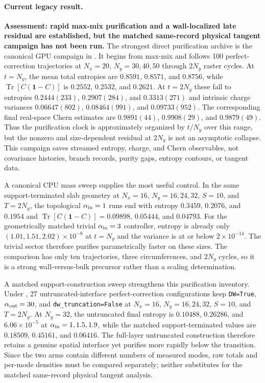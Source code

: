 \documentclass[aps,prx,twocolumn,floatfix,nofootinbib,superscriptaddress,longbibliography]{revtex4-2}
\newcommand{\qTr}{\operatorname{Tr}}
\newcommand{\code}[1]{\texttt{#1}}
\begin{document}
\paragraph*{Current legacy result.}
\textbf{Assessment: rapid max-mix purification and a wall-localized late residual are
established, but the matched same-record physical tangent campaign has not been run.}
The strongest direct purification archive is the canonical GPU campaign in
.  It begins from max-mix
and follows 100 perfect-correction trajectories at $N_x=20$, $N_y=30,40,50$ through
$2N_y$ raster cycles.  At $t=N_y$, the mean total entropies are $0.8591$, $0.8571$, and
$0.8756$, while $\qTr[C(\mathbf{1}-C)]$ is $0.2552$, $0.2532$, and $0.2621$.  At $t=2N_y$ these
fall to entropies $0.2444(233)$, $0.2907(284)$, and $0.3313(271)$ and intrinsic charge
variances $0.06647(802)$, $0.08464(991)$, and $0.09733(952)$.  The corresponding final
real-space Chern estimates are $0.9891(44)$, $0.9908(29)$, and $0.9879(49)$.  Thus the
purification clock is approximately organized by $t/N_y$ over this range, but the nonzero
and size-dependent residual at $2N_y$ is not an asymptotic collapse.  This campaign saves
streamed entropy, charge, and Chern observables, not covariance histories, branch records,
purity gaps, entropy contours, or tangent data.

A canonical CPU mass sweep supplies the most useful control.  In the same support-terminated
slab geometry at $N_x=16$, $N_y=16,24,32$, $S=10$, and $T=2N_y$, the topological
$\alpha_{\rm in}=1$ runs end with entropy $0.3459$, $0.2076$, and $0.1954$ and
$\qTr[C(\mathbf{1}-C)]=0.09898$, $0.05444$, and $0.04793$.  For the geometrically matched trivial
$\alpha_{\rm in}=3$ controller, entropy is already only $(1.01,1.51,2.02)\times10^{-8}$
at $t=N_y$ and the variance is at or below $2\times10^{-14}$.  The trivial sector therefore
purifies parametrically faster on these sizes.  The comparison has only ten trajectories,
three circumferences, and $2N_y$ cycles, so it is a strong wall-versus-bulk precursor rather
than a scaling determination.

A matched support-construction sweep strengthens this purification inventory.  Under
, 27 untruncated-interface perfect-correction
configurations keep \code{DW=True}, $\alpha_{\rm out}=30$, and
\code{dw\_truncation=False} at $N_x=16$, $N_y=16,24,32$, $S=10$, and $T=2N_y$.
At $N_y=32$, the untruncated final entropy is $0.10488$, $0.26286$, and
$6.06\times10^{-5}$ at $\alpha_{\rm in}=1,1.5,1.9$, while the matched
support-terminated values are $0.18509$, $0.45161$, and $0.06416$.  The full-layer
untruncated construction therefore retains a genuine spatial interface yet purifies more
rapidly below the transition.  Since the two arms contain different numbers of measured
modes, raw totals and per-mode densities must be compared separately; neither substitutes
for the matched same-record physical tangent analysis.
\end{document}
